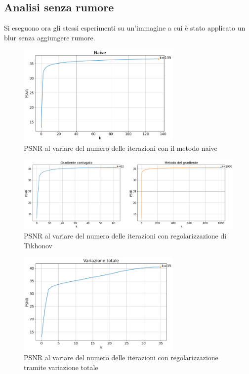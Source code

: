 \documentclass[11pt]{article}
\begin{document}
\subsection{Analisi senza rumore}
Si eseguono ora gli stessi esperimenti su un'immagine a cui è stato applicato un blur senza aggiungere rumore.
\begin{figure}[H]
    \centering
    \includegraphics[width=8cm]{semiconvergenza/3/psnr_naive.png}
    \caption{PSNR al variare del numero delle iterazioni con il metodo naive}
    \label{fig:semiconv_psnr_naive3}
\end{figure}
\begin{figure}[H]
    \centering
    \includegraphics[width=15cm]{semiconvergenza/3/psnr_tikhonov.png}
    \caption{PSNR al variare del numero delle iterazioni con regolarizzazione di Tikhonov}
    \label{fig:semiconv_deblur_tikhonov3}
\end{figure}
\begin{figure}[H]
    \centering
    \includegraphics[width=8cm]{semiconvergenza/3/psnr_tv.png}
    \caption{PSNR al variare del numero delle iterazioni con regolarizzazione tramite variazione totale}
    \label{fig:semiconv_deblur_tv3}
\end{figure}
\end{document}
